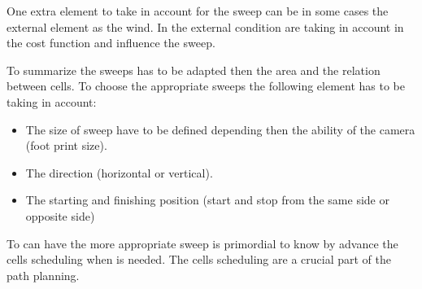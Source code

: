 	One extra element to take in account for the sweep can be in some cases the external element as the wind. In \citep{215*lee2010,190*hsu2014}  %
	the external condition are taking in account in the cost function and influence the sweep.
	
	
	To summarize the sweeps has to be adapted then the area and the relation between cells. To choose the appropriate sweeps the following element has to be taking in account:
	\begin{itemize}
		\item The size of sweep  have to be defined depending then the ability of the camera (foot print size).
		\item The direction (horizontal or vertical).
		\item The  starting and finishing  position (start and stop from the same side or opposite side)
	\end{itemize}
To  can have the more appropriate sweep is primordial to know by advance  the cells scheduling when is needed. The cells scheduling are a crucial part of the path planning.

	
	 

	 
	
